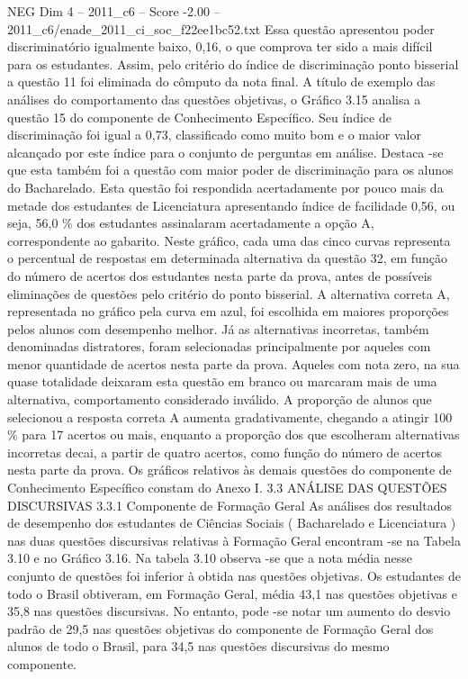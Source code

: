 \begin{textsample}{NEG Dim 4 – 2011\_c6 – Score -2.00 – 2011\_c6/enade\_2011\_ci\_soc\_f22ee1bc52.txt}
Essa questão apresentou poder discriminatório igualmente baixo, 0,16, o que comprova ter sido a mais difícil para os estudantes.
Assim, pelo critério do índice de discriminação ponto bisserial a questão 11 foi eliminada do cômputo da nota final.
A título de exemplo das análises do comportamento das questões objetivas, o Gráfico 3.15 analisa a questão 15 do componente de Conhecimento Específico.
Seu índice de discriminação foi igual a 0,73, classificado como muito bom e o maior valor alcançado por este índice para o conjunto de perguntas em análise.
Destaca -se que esta também foi a questão com maior poder de discriminação para os alunos do Bacharelado.
Esta questão foi respondida acertadamente por pouco mais da metade dos estudantes de Licenciatura apresentando índice de facilidade 0,56, ou seja, 56,0 \% dos estudantes assinalaram acertadamente a opção A, correspondente ao gabarito.
Neste gráfico, cada uma das cinco curvas representa o percentual de respostas em determinada alternativa da questão 32, em função do número de acertos dos estudantes nesta parte da prova, antes de possíveis eliminações de questões pelo critério do ponto bisserial.
A alternativa correta A, representada no gráfico pela curva em azul, foi escolhida em maiores proporções pelos alunos com desempenho melhor.
Já as alternativas incorretas, também denominadas distratores, foram selecionadas principalmente por aqueles com menor quantidade de acertos nesta parte da prova.
Aqueles com nota zero, na sua quase totalidade deixaram esta questão em branco ou marcaram mais de uma alternativa, comportamento considerado inválido.
A proporção de alunos que selecionou a resposta correta A aumenta gradativamente, chegando a atingir 100 \% para 17 acertos ou mais, enquanto a proporção dos que escolheram alternativas incorretas decai, a partir de quatro acertos, como função do número de acertos nesta parte da prova.
Os gráficos relativos às demais questões do componente de Conhecimento Específico constam do Anexo I. 3.3 ANÁLISE DAS QUESTÕES DISCURSIVAS 3.3.1 Componente de Formação Geral As análises dos resultados de desempenho dos estudantes de Ciências Sociais ( Bacharelado e Licenciatura ) nas duas questões discursivas relativas à Formação Geral encontram -se na Tabela 3.10 e no Gráfico 3.16.
Na tabela 3.10 observa -se que a nota média nesse conjunto de questões foi inferior à obtida nas questões objetivas.
Os estudantes de todo o Brasil obtiveram, em Formação Geral, média 43,1 nas questões objetivas e 35,8 nas questões discursivas.
No entanto, pode -se notar um aumento do desvio padrão de 29,5 nas questões objetivas do componente de Formação Geral dos alunos de todo o Brasil, para 34,5 nas questões discursivas do mesmo componente.

\end{textsample}
